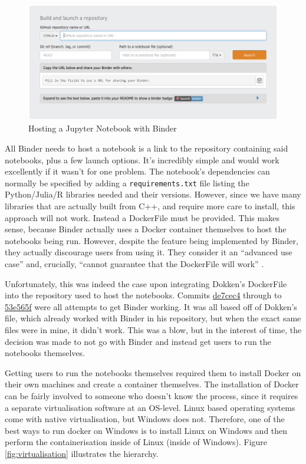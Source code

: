 \begin{figure}[h]
\centering
\includegraphics[scale=0.5]{binder}
\caption{Hosting a Jupyter Notebook with Binder} \label{fig:binder}
\end{figure}

All Binder needs to host a notebook is a link to the repository containing said notebooks, plus a few launch options. It's incredibly simple and would work excellently if it wasn't for one problem. The notebook's dependencies can normally be specified by adding a \texttt{requirements.txt} file listing the Python/Julia/R libraries needed and their versions. However, since we have many libraries that are actually built from C++, and require more care to install, this approach will not work. Instead a DockerFile must be provided. This makes sense, because Binder actually uses a Docker container themselves to host the notebooks being run. However, despite the feature being implemented by Binder, they actually discourage users from using it. They consider it an ``advanced use case'' and, crucially, ``cannot guarantee that the DockerFile will work'' \cite{binder-dockerfile-guide}.

Unfortunately, this was indeed the case upon integrating Dokken's DockerFile into the repository used to host the notebooks. Commits \href{https://github.com/Crypto84/FEMLearningResources/commit/de7cec4592aa68bc6e625533d709ff799cfe6452}{de7cec4} through to \href{https://github.com/Crypto84/FEMLearningResources/commit/53e565f6008c000b9800c41ae86256a9d95364e4}{53e565f} were all attempts to get Binder working. It was all based off of Dokken's file, which already worked with Binder in his repository, but when the exact same files were in mine, it didn't work. This was a blow, but in the interest of time, the decision was made to not go with Binder and instead get users to run the notebooks themselves.

Getting users to run the notebooks themselves required them to install Docker on their own machines and create a container themselves. The installation of Docker can be fairly involved to someone who doesn't know the process, since it requires a separate virtualisation software at an OS-level. Linux based operating systems come with native virtualisation, but Windows does not. Therefore, one of the best ways to run docker on Windows is to install Linux on Windows and then perform the containerisation inside of Linux (inside of Windows). Figure \ref{fig:virtualisation} illustrates the hierarchy.

